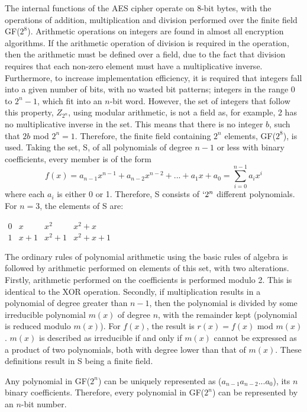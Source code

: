 \documentclass[a4paper,10pt]{report}
\begin{document}
The internal functions of the AES cipher operate on 8-bit bytes, with the operations of addition, multiplication and division performed over the finite field GF($2^{8}$).
Arithmetic operations on integers are found in almost all encryption algorithms. If the arithmetic operation of division is required in the operation, then the arithmetic must be defined over a field, due to the fact that division requires that each non-zero element must have a multiplicative inverse. Furthermore, to increase implementation efficiency, it is required that integers fall into a given number of bits, with no wasted bit patterns; integers in the range 0 to $2^{n} - 1$, which fit into an $n$-bit word. However, the set of integers that follow this property, $Z_{2^{n}}$, using modular arithmetic, is not a field as, for example, 2 has no multiplicative inverse in the set. This means that there is no integer $b$, such that $2b$ mod $2^{n} = 1$. Therefore, the finite field containing $2^{n}$ elements, GF($2^{8}$), is used. Taking the set, S, of all polynomials of degree $n - 1$ or less with binary coefficients, every member is of the form
\[f(x) = a_{n-1}x^{n-1} + a_{n-2}x^{n-2} + ... + a_{1}x + a_{0} = \sum_{i=0}^{n-1}a_{i}x^{i}\] 
where each $a_{i}$ is either 0 or 1. Therefore, S consists of $`2^{n}$ different polynomials. For $n = 3$, the elements of S are:
\begin{center}
$
\begin{matrix}
  0 & x & x^{2} & x^{2} + x \\
  1 & x + 1 & x^{2} + 1 & x^{2} + x + 1 
 \end{matrix}
$
\end{center}
The ordinary rules of polynomial arithmetic using the basic rules of algebra is followed by arithmetic performed on elements of this set, with two alterations. Firstly, arithmetic performed on the coefficients is performed modulo 2. This is identical to the XOR operation. Secondly, if multiplication results in a polynomial of degree greater than $n - 1$, then the polynomial is divided by some irreducible polynomial $m(x)$ of degree $n$, with the remainder kept (polynomial is reduced modulo $m(x)$). For $f(x)$, the result is $r(x) = f(x)$ mod $m(x)$. $m(x)$ is described as irreducible if and only if $m(x)$ cannot be expressed as a product of two polynomials, both with degree lower than that of $m(x)$. These definitions result in S being a finite field.

Any polynomial in GF($2^{n}$) can be uniquely represented as ($a_{n-1}a_{n-2}...a_{0}$), its $n$ binary coefficients. Therefore, every polynomial in GF($2^{n}$) can be represented by an $n$-bit number. 
\end{document}
